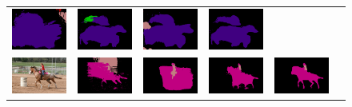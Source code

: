 \begin{figure}[!htbp]
{\begin{tabular}{c c c c c c}
    \includegraphics[height=0.122\linewidth]{fig/val_crf_vis/bbox/2007_002852.png} &
    \includegraphics[height=0.122\linewidth]{fig/val_crf_vis/bbox_crf/2007_002852.png} &
    \includegraphics[height=0.122\linewidth]{fig/val_crf_vis/strongweak/2007_002852.png} &
    \includegraphics[height=0.122\linewidth]{fig/val_crf_vis/cocomix/2007_002852.png} \\
    \includegraphics[height=0.11\linewidth]{fig/val_crf_vis/img/2007_003022.jpg} &
    \includegraphics[height=0.11\linewidth]{fig/val_crf_vis/adaweak/2007_003022.png} &
    \includegraphics[height=0.11\linewidth]{fig/val_crf_vis/bbox/2007_003022.png} &
    \includegraphics[height=0.11\linewidth]{fig/val_crf_vis/bbox_crf/2007_003022.png} &
    \includegraphics[height=0.11\linewidth]{fig/val_crf_vis/strongweak/2007_003022.png} &

\end{tabular}}
\end{figure}
